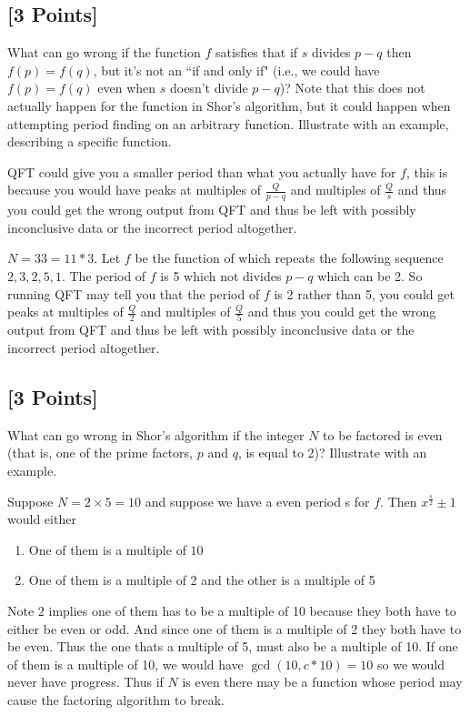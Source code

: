 \documentclass[11pt]{article}
\begin{document}
\subsection{[3 Points]} What can go wrong if the function $f$ satisfies that if $s$ divides $p-q$ then $f(p)=f(q)$, but it's not an ``if and only if"
(i.e., we could have $f(p)=f(q)$ even when $s$ doesn't divide $p-q$)? Note that this does not actually happen for the function in Shor's algorithm, but it could happen when attempting period finding on an arbitrary function. Illustrate with an example, describing a specific function.

\begin{solution}
    QFT could give you a smaller period than what you actually have for $f$, this is because you would have peaks at multiples of $\frac{Q}{p - q}$ and multiples of $\frac{Q}{s}$ and thus you could get the wrong output from QFT and thus be left with possibly inconclusive data or the incorrect period altogether.   
    

    $N = 33 = 11 * 3$. Let $f$ be the function of which repeats the following sequence $2, 3, 2, 5, 1$. The period of $f$ is 5 which not divides $p - q$ which can be 2. So running QFT may tell you that the period of $f$ is 2 rather than 5, you could get peaks at multiples of $\frac{Q}{2}$ and multiples of $\frac{Q}{5}$ and thus you could get the wrong output from QFT and thus be left with possibly inconclusive data or the incorrect period altogether.            
\end{solution}


\subsection{[3 Points]} What can go wrong in Shor's algorithm if the integer $N$ to be factored is even (that is, one of the prime factors, $p$ and $q$, is equal to 2)?  Illustrate with an example.

\begin{solution}
    Suppose $N = 2 \times 5 = 10$ and suppose we have a even period s for $f$. Then $x^{\frac{s}{2}} \pm 1$ would either 
    
    \begin{enumerate}
        \item One of them is a multiple of $10$
        \item One of them is a multiple of 2 and the other is a multiple of 5 
    \end{enumerate}

    Note $2$ implies one of them has to be a multiple of 10 because they both have to either be even or odd. And since one of them is a multiple of 2 they both have to be even. Thus the one thats a multiple of 5, must also be a multiple of 10. If one of them is a multiple of 10, we would have $\gcd(10, c * 10) = 10$ so we would never have progress. Thus if $N$ is even there may be a function whose period may cause the factoring algorithm to break.    
    
\end{solution}
\end{document}
